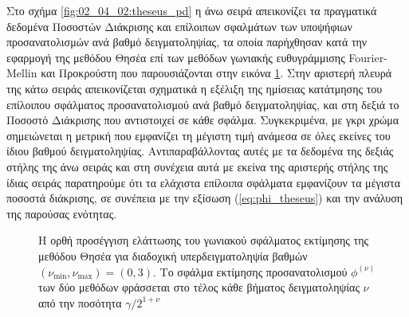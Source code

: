 Στο σχήμα \ref{fig:02_04_02:theseus_pd} η άνω σειρά απεικονίζει τα πραγματικά
δεδομένα Ποσοστών Διάκρισης και επίλοιπων σφαλμάτων των υποψήφιων
προσανατολισμών ανά βαθμό δειγματοληψίας, τα οποία παρήχθησαν κατά την εφαρμογή
της μεθόδου Θησέα επί των μεθόδων γωνιακής ευθυγράμμισης Fourier-Mellin και
Προκρούστη που παρουσιάζονται στην εικόνα \ref{fig:02_04_02:theseus}. Στην
αριστερή πλευρά της κάτω σειράς απεικονίζεται σχηματικά η εξέλιξη της ημίσειας
κατάτμησης του επίλοιπου σφάλματος προσανατολισμού ανά βαθμό δειγματοληψίας,
και στη δεξιά το Ποσοστό Διάκρισης που αντιστοιχεί σε κάθε σφάλμα.
Συγκεκριμένα, με γκρι χρώμα σημειώνεται η μετρική που εμφανίζει τη μέγιστη τιμή
ανάμεσα σε όλες εκείνες του ίδιου βαθμού δειγματοληψίας.  Αντιπαραβάλλοντας
αυτές με τα δεδομένα της δεξιάς στήλης της άνω σειράς και στη συνέχεια αυτά με
εκείνα της αριστερής στήλης της ίδιας σειράς παρατηρούμε ότι τα ελάχιστα
επίλοιπα σφάλματα εμφανίζουν τα μέγιστα ποσοστά διάκρισης, σε συνέπεια με την
εξίσωση (\ref{eq:phi_theseus}) και την ανάλυση της παρούσας ενότητας.


\begin{figure}[h]\centering
  \vspace{1.0cm}
  
  \vspace{0.5cm}
  \caption{\small Η ορθή προσέγγιση ελάττωσης του γωνιακού σφάλματος εκτίμησης
           της μεθόδου Θησέα για διαδοχική υπερδειγματοληψία βαθμών
           $(\nu_{\min}, \nu_{\max}) = (0,3)$. Το σφάλμα εκτίμησης
           προσανατολισμού $\phi^{(\nu)}$ των δύο μεθόδων φράσσεται στο τέλος
           κάθε βήματος δειγματοληψίας $\nu$ από την ποσότητα
           $\gamma/2^{1+\nu}$}
  \label{fig:02_04_02:theseus}
\end{figure}

